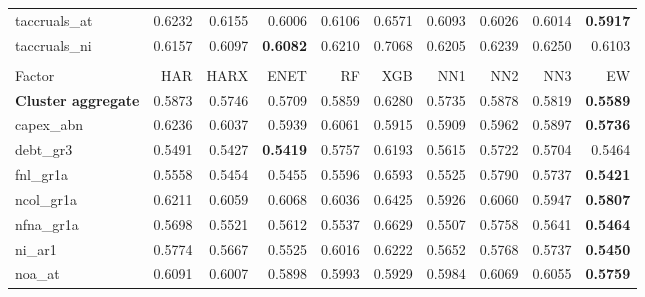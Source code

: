 \begin{longtable}{>{\raggedright\arraybackslash}p{2.6cm}rrrrrrrrr}
taccruals\_at & 0.6232 & \cellcolor{blue!10}0.6155 & \cellcolor{blue!10}0.6006 & \cellcolor{blue!10}0.6106 & 0.6571 & \cellcolor{blue!10}0.6093 & \cellcolor{blue!10}0.6026 & \cellcolor{blue!10}0.6014 & \textbf{\cellcolor{blue!10}0.5917} \\
taccruals\_ni & 0.6157 & \cellcolor{blue!10}0.6097 & \textbf{\cellcolor{blue!10}0.6082} & 0.6210 & 0.7068 & 0.6205 & 0.6239 & 0.6250 & \cellcolor{blue!10}0.6103 \\
\hline
\multicolumn{10}{@{}l}{\textit{Panel B. Debt Issuance}} \\
\hline
Factor & HAR & HARX & ENET & RF & XGB & NN1 & NN2 & NN3 & EW \\
\hline
\textbf{Cluster aggregate} & 0.5873 & \cellcolor{blue!10}0.5746 & \cellcolor{blue!10}0.5709 & \cellcolor{blue!10}0.5859 & 0.6280 & \cellcolor{blue!10}0.5735 & 0.5878 & \cellcolor{blue!10}0.5819 & \textbf{\cellcolor{blue!10}0.5589} \\
capex\_abn & 0.6236 & \cellcolor{blue!10}0.6037 & \cellcolor{blue!10}0.5939 & \cellcolor{blue!10}0.6061 & \cellcolor{blue!10}0.5915 & \cellcolor{blue!10}0.5909 & \cellcolor{blue!10}0.5962 & \cellcolor{blue!10}0.5897 & \textbf{\cellcolor{blue!10}0.5736} \\
debt\_gr3 & 0.5491 & \cellcolor{blue!10}0.5427 & \textbf{\cellcolor{blue!10}0.5419} & 0.5757 & 0.6193 & 0.5615 & 0.5722 & 0.5704 & \cellcolor{blue!10}0.5464 \\
fnl\_gr1a & 0.5558 & \cellcolor{blue!10}0.5454 & \cellcolor{blue!10}0.5455 & 0.5596 & 0.6593 & \cellcolor{blue!10}0.5525 & 0.5790 & 0.5737 & \textbf{\cellcolor{blue!10}0.5421} \\
ncol\_gr1a & 0.6211 & \cellcolor{blue!10}0.6059 & \cellcolor{blue!10}0.6068 & \cellcolor{blue!10}0.6036 & 0.6425 & \cellcolor{blue!10}0.5926 & \cellcolor{blue!10}0.6060 & \cellcolor{blue!10}0.5947 & \textbf{\cellcolor{blue!10}0.5807} \\
nfna\_gr1a & 0.5698 & \cellcolor{blue!10}0.5521 & \cellcolor{blue!10}0.5612 & \cellcolor{blue!10}0.5537 & 0.6629 & \cellcolor{blue!10}0.5507 & 0.5758 & \cellcolor{blue!10}0.5641 & \textbf{\cellcolor{blue!10}0.5464} \\
ni\_ar1 & 0.5774 & \cellcolor{blue!10}0.5667 & \cellcolor{blue!10}0.5525 & 0.6016 & 0.6222 & \cellcolor{blue!10}0.5652 & \cellcolor{blue!10}0.5768 & \cellcolor{blue!10}0.5737 & \textbf{\cellcolor{blue!10}0.5450} \\
noa\_at & 0.6091 & \cellcolor{blue!10}0.6007 & \cellcolor{blue!10}0.5898 & \cellcolor{blue!10}0.5993 & \cellcolor{blue!10}0.5929 & \cellcolor{blue!10}0.5984 & \cellcolor{blue!10}0.6069 & \cellcolor{blue!10}0.6055 & \textbf{\cellcolor{blue!10}0.5759} \\

\end{longtable}
